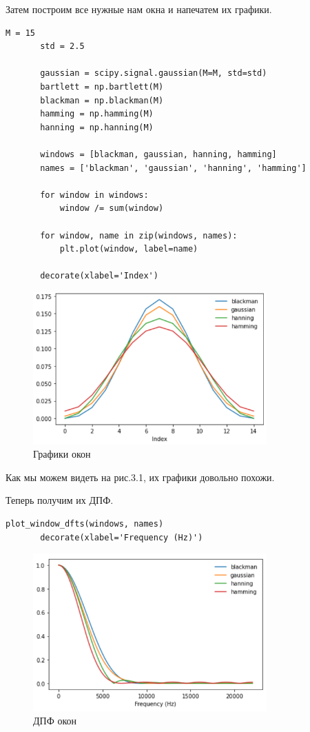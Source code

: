 \documentclass[a4paper,12pt]{report}
\begin{document}
    Затем построим все нужные нам окна и напечатем их графики. 
\begin{lstlisting}[caption=Построение окон]
       M = 15
       std = 2.5

       gaussian = scipy.signal.gaussian(M=M, std=std)   
       bartlett = np.bartlett(M)
       blackman = np.blackman(M)
       hamming = np.hamming(M)
       hanning = np.hanning(M)

       windows = [blackman, gaussian, hanning, hamming]
       names = ['blackman', 'gaussian', 'hanning', 'hamming']

       for window in windows:
           window /= sum(window)

       for window, name in zip(windows, names):
           plt.plot(window, label=name)

       decorate(xlabel='Index')
\end{lstlisting}    
\begin{figure}[H]
        \centering
        \includegraphics[width=0.8\textwidth]{fig3-1.PNG}
        \caption{Графики окон}
        \label{fig:fig3-1}
\end{figure}

     Как мы можем видеть на рис.3.1, их графики довольно похожи.

    Теперь получим их ДПФ.
\begin{lstlisting}[caption=Построение ДПФ]
       plot_window_dfts(windows, names)
       decorate(xlabel='Frequency (Hz)')
\end{lstlisting}
\begin{figure}[H]
        \centering
        \includegraphics[width=0.8\textwidth]{fig3-2.PNG}
        \caption{ДПФ окон}
        \label{fig:fig3-2}
\end{figure}     
       
\end{document}
